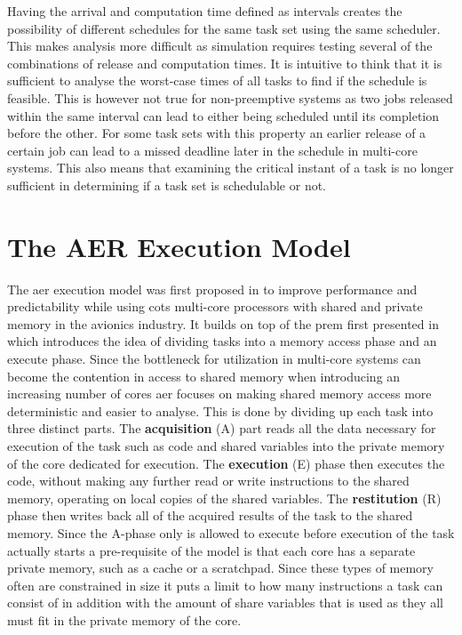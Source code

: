 \documentclass{kththesis}
\begin{document}
Having the arrival and computation time defined as intervals creates the possibility of different
schedules for the same task set using the same scheduler. This makes analysis more difficult as
simulation requires testing several of the combinations of release and computation times. It is
intuitive to think that it is sufficient to analyse the worst-case times of all tasks to find if the
schedule is feasible. This is however not true for non-preemptive systems as two jobs released
within the same interval can lead to either being scheduled until its completion before the other.
For some task sets with this property an earlier release of a certain job can lead to a missed
deadline later in the schedule in multi-core systems. This also means that examining the critical
instant of a task is no longer sufficient in determining if a task set is schedulable or not.


\section{The AER Execution Model}

The \acrfull{aer} execution model was first proposed in \parencite{durrieu_predictable_2014} to
improve performance and predictability while using \acrshort{cots} multi-core processors with shared
and private memory in the avionics industry. It builds on top of the \acrfull{prem} first presented
in \parencite{pellizzoni_predictable_2011} which introduces the idea of dividing tasks into a memory
access phase and an execute phase. Since the bottleneck for utilization in multi-core systems can
become the contention in access to shared memory when introducing an increasing number of cores
\acrshort{aer} focuses on making shared memory access more deterministic and easier to analyse. This
is done by dividing up each task into three distinct parts. The \textbf{acquisition} (A) part reads all
the data necessary for execution of the task such as code and shared variables into the private
memory of the core dedicated for execution. The \textbf{execution} (E) phase then executes the code,
without making any further read or write instructions to the shared memory, operating on local
copies of the shared variables. The \textbf{restitution} (R) phase then writes back all of the acquired
results of the task to the shared memory. Since the A-phase only is allowed to execute before
execution of the task actually starts a pre-requisite of the model is that each core has a separate
private memory, such as a cache or a scratchpad. Since these types of memory often are constrained
in size it puts a limit to how many instructions a task can consist of in addition with the amount
of share variables that is used as they all must fit in the private memory of the core.
\end{document}
